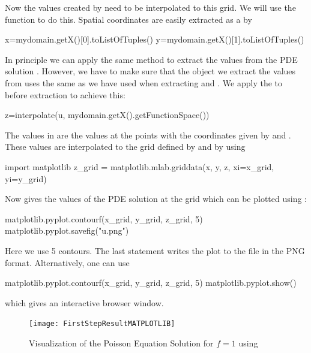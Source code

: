 Now the values created by \escript need to be interpolated to this grid.
We will use the \MATPLOTLIB {} function to do this.
Spatial coordinates are easily extracted as a  by
\begin{python}
  x=mydomain.getX()[0].toListOfTuples()
  y=mydomain.getX()[1].toListOfTuples()
\end{python}
In principle we can apply the same  method to extract the values from the PDE solution .
However, we have to make sure that the \Data object we extract the values from
uses the same \FunctionSpace as we have used when extracting  and .
We apply the  to  before extraction to achieve this:
\begin{python}
  z=interpolate(u, mydomain.getX().getFunctionSpace())
\end{python}
The values in  are the values at the points with the coordinates given by  and .
These values are interpolated to the grid defined by  and  by using
\begin{python}
  import matplotlib
  z_grid = matplotlib.mlab.griddata(x, y, z, xi=x_grid, yi=y_grid)
\end{python}
Now  gives the values of the PDE solution  at the grid which can be plotted using :
\begin{python}
  matplotlib.pyplot.contourf(x_grid, y_grid, z_grid, 5)
  matplotlib.pyplot.savefig("u.png")
\end{python}
Here we use 5 contours. The last statement writes the plot to the file  in the PNG format.
Alternatively, one can use 
\begin{python}
  matplotlib.pyplot.contourf(x_grid, y_grid, z_grid, 5)
  matplotlib.pyplot.show()
\end{python}
which gives an interactive browser window.

\begin{figure}
\centerline{\texttt{[image: FirstStepResultMATPLOTLIB]}}
\caption{Visualization of the Poisson Equation Solution for $f=1$ using \MATPLOTLIB}
\label{fig:FirstSteps.3b}
\end{figure}

